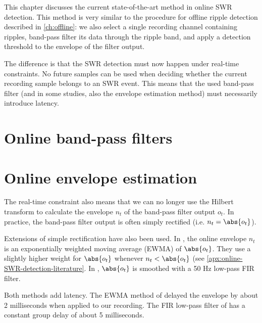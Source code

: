 \label{ch:BPF}

This chapter discusses the current state-of-the-art method in online SWR detection. This method is very similar to the procedure for offline ripple detection described in \cref{ch:offline}: we also select a single recording channel containing ripples, band-pass filter its data through the ripple band, and apply a detection threshold to the envelope of the filter output.

The difference is that the SWR detection must now happen under real-time constraints. No future samples can be used when deciding whether the current recording sample belongs to an SWR event. This means that the used band-pass filter (and in some studies, also the envelope estimation method) must necessarily introduce latency.



\section{Online band-pass filters}




\section{Online envelope estimation}

The real-time constraint also means that we can no longer use the Hilbert transform to calculate the envelope $n_t$ of the band-pass filter output $o_t$. In practice, the band-pass filter output is often simply rectified (i.e. $n_t = \abs{o_t}$).

Extensions of simple rectification have also been used. In , the online envelope $n_t$ is an exponentially weighted moving average (EWMA) of $\abs{o_t}$. They use a slightly higher weight for $\abs{o_t}$  whenever $n_t < \abs{o_t}$ (see \cref{apx:online-SWR-detection-literature}. In , $\abs{o_t}$ is smoothed with a 50 Hz low-pass FIR filter.

Both methods add latency. The EWMA method of \citeauthor*{Jadhav2012} delayed the envelope by about 2 milliseconds when applied to our recording. The FIR low-pass filter of \citeauthor*{Dutta2018} has a constant group delay of about 5 milliseconds.


